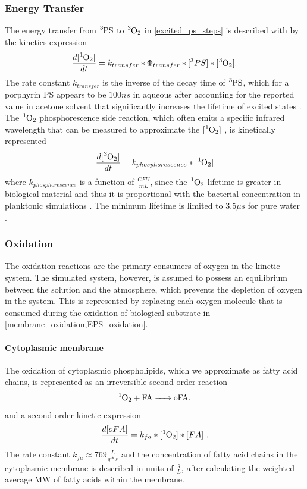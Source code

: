 \subsubsection{Energy Transfer}
The energy transfer from $\ce{^3PS}$ to $\ce{^3O2}$  in \cref{excited_ps_steps} is described with by the kinetics expression
\begin{equation} \label{energy_transfer_kinetics}
    \frac{d[\ce{^1O2}]}{dt} = k_{transfer}*\Phi_{transfer}*[^3PS]*[\ce{^3O2}]. 
\end{equation}
The rate constant $k_{transfer}$ is the inverse of the decay time of $\ce{^3PS}$, which for a porphyrin PS appears to be $100 ns$ in aqueous after accounting for the reported value \cite{Kupper2002KineticsOxygen} in acetone solvent that significantly increases the lifetime of excited states \cite{Spikes1992QuantumUroporphyrin}. The $\ce{^1O2}$ phosphorescence side reaction, which often emits a specific infrared wavelength that can be measured to approximate the $[\ce{^1O2}]$ \cite{Macpherson1993DirectCentres}, is kinetically represented 
\begin{equation}
    \frac{d[\ce{^3O2}]}{dt} = k_{phosphorescence}*[\ce{^1O2}]
\end{equation}
where $k_{phosphorescence}$ is a function of $\frac{CFU}{mL}$, since the $\ce{^1O2}$ lifetime is greater in biological material and thus it is proportional with the bacterial concentration in planktonic simulations \cite{Maisch2007TheBacteria}. The minimum lifetime is limited to $3.5\mu s$ for pure water \cite{Baier2005Time-resolvedCells}.

\subsubsection{Oxidation}
The oxidation reactions are the primary consumers of oxygen in the kinetic system. The simulated system, however, is assumed to possess an equilibrium between the solution and the atmosphere, which prevents the depletion of oxygen in the system. This is represented by replacing each oxygen molecule that is consumed during the oxidation of biological substrate in \cref{membrane_oxidation,EPS_oxidation}.

\paragraph{Cytoplasmic membrane} 
The oxidation of cytoplasmic phospholipids, which we approximate as fatty acid chains, is represented as an irreversible second-order reaction \cite{Watabe2007OxidationMembranes.}
\begin{equation} \label{membrane_oxidation}
    \ce{^1O2 + FA -> oFA}.
\end{equation}
and a second-order kinetic expression
\begin{equation} \label{membrane_oxidation_kinetics}
    \frac{d[oFA]}{dt} = k_{fa}*[\ce{^1O2}]*[FA]~.
\end{equation}
The rate constant $k_{fa} \approx 769 \frac{L}{g*s}$ \cite{Mukai2019KineticSolution} and the concentration of fatty acid chains in the cytoplasmic membrane is described in units of $\frac{g}{L}$, after calculating the weighted average MW of fatty acids within the membrane. 


